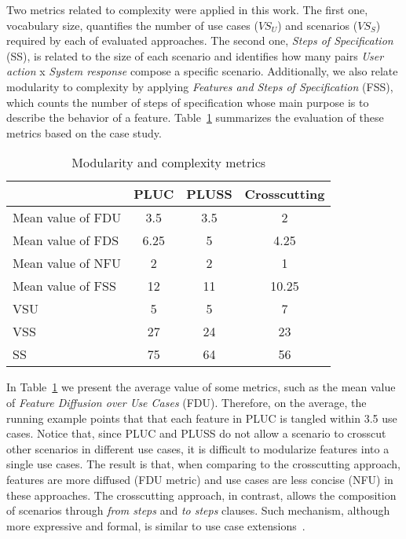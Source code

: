 \documentclass{acm_proc_article-sp}
\begin{document}
Two metrics related to complexity were applied in this work. The first one, vocabulary size,
quantifies the number of use cases ($VS_{U}$) and scenarios ($VS_{S}$) required by each of evaluated
approaches. The second one, \emph{Steps of Specification} (SS), is related to the size of each 
scenario and identifies how many pairs \emph{User action} x \emph{System response} compose a specific scenario. 
Additionally, we also relate modularity to complexity by applying \emph{Features and Steps of Specification} (FSS), which counts the number of steps of specification whose main purpose is to describe the behavior of a feature. 
Table~\ref{tab:metrics} summarizes the evaluation of these metrics based on the case study.

\begin{table}[hb]
\centering
\caption{Modularity and complexity metrics}
\label{tab:metrics}
\begin{tabular}{lccc} \hline
					& PLUC 	& PLUSS 	& Crosscutting	\\ \hline
Mean value of FDU 		& 3.5	& 3.5	& 2		\\
Mean value of FDS 		& 6.25	& 5		& 4.25	\\
Mean value of NFU 		& 2		& 2		& 1		\\
Mean value of FSS 		&12		& 11		& 10.25	\\ 
VSU 					& 5		& 5		& 7		\\
VSS 					& 27		& 24		& 23		\\
SS 					& 75		& 64		& 56		\\	\hline
\end{tabular}
\end{table}

In Table~\ref{tab:metrics} we present the average value 
of some metrics, such as the mean value of \emph{Feature Diffusion over Use Cases} (FDU). Therefore, on the average, the running 
example points that that each feature in PLUC is tangled within 3.5 use cases. Notice that, 
since PLUC and PLUSS do not allow a scenario to crosscut other scenarios in different use cases, it is difficult to modularize 
features into a single use cases. The result is that, when comparing to the crosscutting approach, features are more 
diffused (FDU metric) and use cases are less concise (NFU) in these approaches. 
The crosscutting approach, in contrast, allows the composition of scenarios through \emph{from steps} and \emph{to steps} clauses. 
Such mechanism, although more expressive and formal, is similar to use case extensions~\cite{jacobson-oose, jacobson-reuse-book, jacobson-aosd-book}.
\end{document}
